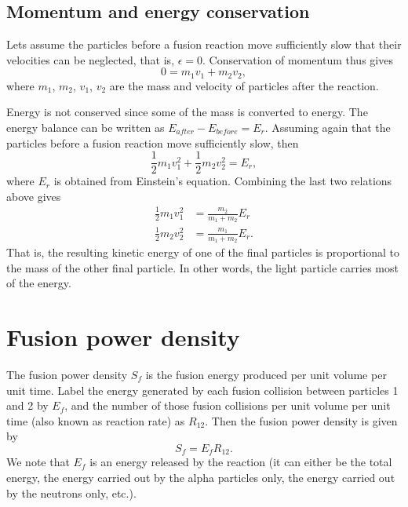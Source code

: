 \documentclass[a4paper,11pt]{article}
\begin{document}
\subsection{Momentum and energy conservation}
Lets assume the particles before a fusion reaction move sufficiently slow that their velocities can be neglected, that is, $\epsilon = 0$. Conservation of momentum thus gives
\begin{equation}
0 = m_1 v_1 + m_2 v_2,
\end{equation}
where $m_1$, $m_2$, $v_1$, $v_2$ are the mass and velocity of particles after the reaction.

Energy is not conserved since some of the mass is converted to energy. The energy balance can be written as $E_{after} - E_{before} = E_r$. Assuming again that the particles before a fusion reaction move sufficiently slow, then
\begin{equation}
\frac{1}{2} m_1 v_1^2 + \frac{1}{2} m_2 v_2^2 = E_r,
\end{equation}
where $E_r$ is obtained from Einstein's equation. Combining the last two relations above gives
\begin{align}
    \frac{1}{2} m_1 v_1^2 &= \frac{m_2}{m_1 + m_2} E_r \nonumber \\
    \frac{1}{2} m_2 v_2^2 &= \frac{m_1}{m_1 + m_2} E_r.
\end{align}
That is, the resulting kinetic energy of one of the final particles is proportional to the mass of the other final particle. In other words, the light particle carries most of the energy.

\section{Fusion power density}
The fusion power density $S_f$ is the fusion energy produced per unit volume per unit time. Label the energy generated by each fusion collision between particles 1 and 2 by $E_f$, and the number of those fusion collisions per unit volume per unit time (also known as reaction rate) as $R_{12}$. Then the fusion power density is given by 
\begin{equation}
    S_f = E_f R_{12}.
\end{equation}
We note that $E_f$ is an energy released by the reaction (it can either be the total energy, the energy carried out by the alpha particles only, the energy carried out by the neutrons only, etc.). 
\end{document}
